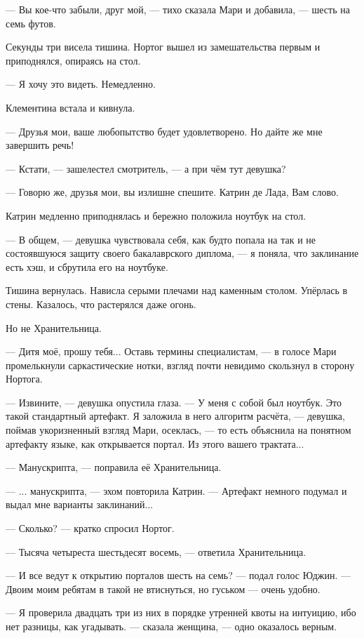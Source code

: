 --- Вы кое-что забыли, друг мой, --- тихо сказала Мари и добавила, --- шесть на семь футов.

\emptypar

Секунды три висела тишина.
Нортог вышел из замешательства первым и приподнялся, опираясь на стол.

--- Я хочу это видеть. Немедленно.

Клементина встала и кивнула.

--- Друзья мои, ваше любопытство будет удовлетворено. Но дайте же мне завершить речь!

--- Кстати, --- зашелестел смотритель, --- а при чём тут девушка?

--- Говорю же, друзья мои, вы излишне спешите. Катрин де Лада, Вам слово.

Катрин медленно приподнялась и бережно положила ноутбук на стол.

--- В общем, --- девушка чувствовала себя, как будто попала на так и не состоявшуюся защиту своего бакалаврского диплома,
--- я поняла, что заклинание есть хэш, и сбрутила его на ноутбуке.

Тишина вернулась. Нависла серыми плечами над каменным столом. Упёрлась в стены. Казалось, что растерялся даже огонь.

Но не Хранительница.

--- Дитя моё, прошу тебя... Оставь термины специалистам, --- в голосе Мари промелькнули саркастические нотки, взгляд
почти невидимо скользнул в сторону Нортога.

--- Извините, --- девушка опустила глаза. --- У меня с собой был ноутбук. Это такой стандартный артефакт.
Я заложила в него алгоритм расчёта, --- девушка, поймав укоризненный взгляд Мари, осеклась,
--- то есть объяснила на понятном артефакту языке, как открывается портал. Из этого вашего трактата...

--- Манускрипта, --- поправила её Хранительница.

--- ... манускрипта, --- эхом повторила Катрин. --- Артефакт немного подумал и выдал мне варианты заклинаний...

--- Сколько? --- кратко спросил Нортог.

--- Тысяча четыреста шестьдесят восемь, --- ответила Хранительница.

--- И все ведут к открытию порталов шесть на семь? --- подал голос Юджин.
--- Двоим моим ребятам в такой не втиснуться, но гуськом --- очень удобно.

--- Я проверила двадцать три из них в порядке утренней квоты на интуицию, ибо нет разницы, как угадывать. ---
сказала женщина, --- одно оказалось верным.


